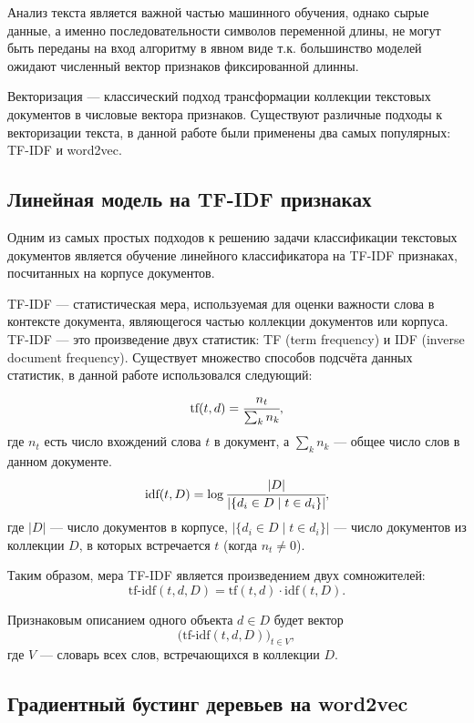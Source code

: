 \documentclass[a4paper, 14pt]{extarticle}
\begin{document}
Анализ текста является важной частью машинного обучения, однако сырые данные, а именно последовательности символов переменной длины,
не могут быть переданы на вход алгоритму в явном виде т.к. большинство моделей ожидают численный вектор признаков фиксированной длинны.

Векторизация --- классический подход трансформации коллекции текстовых документов в числовые вектора признаков.
Существуют различные подходы к векторизации текста, в данной работе были применены два самых популярных: TF-IDF и word2vec.

\subsection{Линейная модель на TF-IDF признаках}
Одним из самых простых подходов к решению задачи классификации текстовых документов является обучение линейного классификатора на
TF-IDF признаках, посчитанных на корпусе документов.

TF-IDF --- статистическая мера, используемая для оценки важности слова в контексте 
документа, являющегося частью коллекции документов или корпуса. TF-IDF --- это произведение двух статистик: TF (term frequency) и IDF (inverse 
document frequency). Существует множество способов подсчёта данных статистик, в данной работе использовался следующий:
$$
\text{tf}(t, d) = \cfrac{n_t}{\sum_{k} n_k},
$$
где $n_{t}$ есть число вхождений слова $t$ в документ, а $\sum_{k} n_k$ --- общее число слов в данном документе.
$$
\text{idf}(t, D) = \log{ \cfrac{|D|}{|\{ d_i \in D \mid t \in d_i \}|}},
$$
где $|D|$ --- число документов в корпусе, $|\{ d_i \in D \mid t \in d_i \}|$ — число документов из коллекции $D$, в которых встречается 
$t$ (когда $n_{t} \neq 0$).

Таким образом, мера TF-IDF является произведением двух сомножителей:
$$
\text{tf-idf}(t, d, D) = \text{tf}(t, d) \cdot \text{idf}(t, D).
$$

Признаковым описанием одного объекта $d \in D$ будет вектор
$$
\big(\text{tf-idf}(t,d,D)\big)_{t\in V},
$$
где $V$ --- словарь всех слов, встречающихся в коллекции $D$.


\subsection{Градиентный бустинг деревьев на word2vec}
\end{document}
